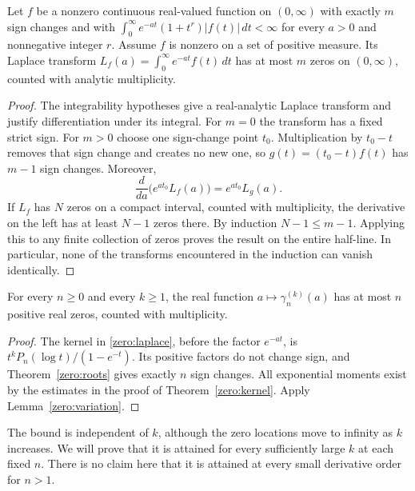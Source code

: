 \begin{lemma}\label{zero:variation}
Let $f$ be a nonzero continuous real-valued function on $(0,\infty)$ with exactly
$m$ sign changes and with
$\int_0^\infty e^{-at}(1+t^r)|f(t)|\,dt<\infty$ for every $a>0$
and nonnegative integer $r$.  Assume $f$ is nonzero on a
set of positive measure.  Its Laplace transform
$L_f(a)=\int_0^\infty e^{-at}f(t)\,dt$ has at most $m$ zeros on
$(0,\infty)$, counted with analytic multiplicity.
\end{lemma}
\begin{proof}
The integrability hypotheses give a real-analytic Laplace transform
and justify differentiation under its integral.
For $m=0$ the transform has a fixed strict sign.  For $m>0$ choose
one sign-change point $t_0$.  Multiplication by $t_0-t$ removes
that sign change and creates no new one, so
$g(t)=(t_0-t)f(t)$ has $m-1$ sign changes.  Moreover,
\[
 \frac{d}{da}\bigl(e^{at_0}L_f(a)\bigr)=e^{at_0}L_g(a).
\]
If $L_f$ has $N$ zeros on a compact interval, counted with
multiplicity, the derivative on the left has at least $N-1$ zeros
there.  By induction $N-1\leq m-1$.  Applying this to any finite
collection of zeros proves the result on the entire half-line.
In particular, none of the transforms encountered in the induction
can vanish identically.
\end{proof}

\begin{theorem}\label{zero:at-most}
For every $n\geq0$ and every $k\geq1$, the real function
$a\mapsto\gamma_n^{(k)}(a)$ has at most $n$ positive real zeros,
counted with multiplicity.
\end{theorem}
\begin{proof}
The kernel in \eqref{zero:laplace}, before the factor $e^{-at}$,
is $t^kP_n(\log t)/(1-e^{-t})$.  Its positive factors do not change
sign, and Theorem~\ref{zero:roots} gives exactly $n$ sign changes.
All exponential moments exist by the estimates in the proof of
Theorem~\ref{zero:kernel}.  Apply Lemma~\ref{zero:variation}.
\end{proof}

The bound is independent of $k$, although the zero locations move to
infinity as $k$ increases.  We will prove that it is attained for
every sufficiently large $k$ at each fixed $n$.  There is no claim
here that it is attained at every small derivative order for $n>1$.

